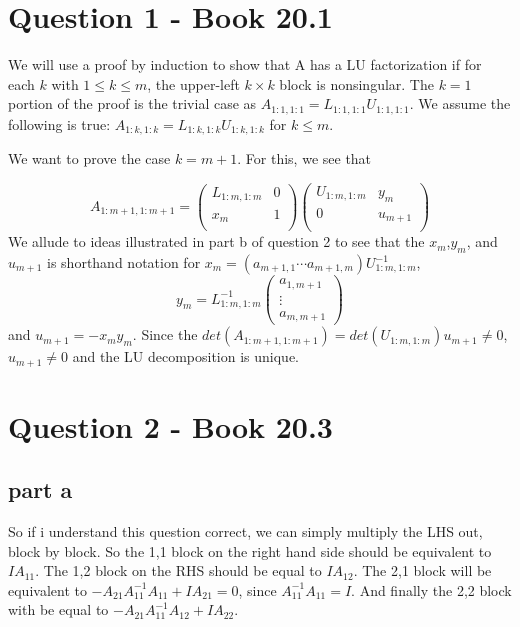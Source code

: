 \documentclass[a4paper,12pt]{article}
\begin{document}
\section{Question 1 - Book 20.1}
We will use a proof by induction to show that A has a LU factorization if for each $k$ with $1\leq k \leq m$, the upper-left $k \times k$ block is nonsingular. The $k=1$ portion of the proof is the trivial case as $A_{1:1,1:1}=L_{1:1,1:1}U_{1:1,1:1}$.  We assume the following is true: $A_{1:k,1:k}=L_{1:k,1:k}U_{1:k,1:k}$ for $k \leq m$. 

We want to prove the case $k=m+1$. For this, we see that

\begin{equation}
A_{1:m+1,1:m+1} =\begin{pmatrix}
L_{1:m,1:m} & 0 \\
x_m & 1 \\
\end{pmatrix}
\begin{pmatrix}
U_{1:m,1:m} & y_m \\
0 &	u_{m+1}\\
\end{pmatrix}
\end{equation}
We allude to ideas illustrated in part b of question 2 to see that the $x_m$,$y_m$, and $u_{m+1}$ is shorthand notation for $x_m=(a_{m+1,1}\cdots a_{m+1,m})U_{1:m,1:m}^{-1}$, 
\begin{equation}
y_m=L_{1:m,1:m}^{-1}\begin{pmatrix}
a_{1,m+1} \\
\vdots \\
a_{m,m+1}
\end{pmatrix}
\end{equation} and $u_{m+1}=-x_my_m$. Since the $det(A_{1:m+1,1:m+1})=det(U_{1:m,1:m})u_{m+1} \neq 0$, $u_{m+1} \neq 0 $ and the LU decomposition is unique. 

\section{Question 2 - Book 20.3}
\subsection{part a}
So if i understand this question correct, we can simply multiply the LHS out, block by block. So the 1,1 block on the right hand side should be equivalent to $IA_{11}$. The 1,2 block on the RHS should be equal to $IA_{12}$. The 2,1 block will be equivalent to $-A_{21}A_{11}^{-1}A_{11} + IA_{21}=0$, since $A_{11}^{-1}A_{11}=I$. And finally the 2,2 block with be equal to $-A_{21}A_{11}^{-1}A_{12} + IA_{22}$.
\end{document}

